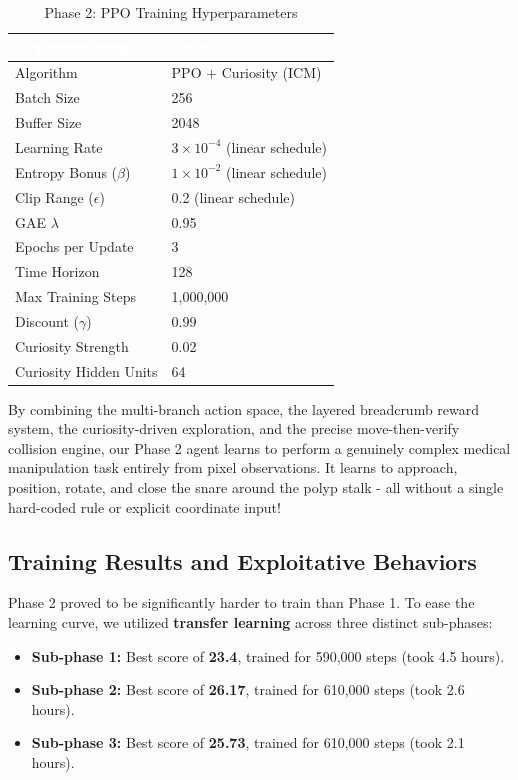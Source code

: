 \begin{table}[H]
\centering
\caption{Phase 2: PPO Training Hyperparameters}
\label{tab:p2_hyperparameters}
\begin{tabular}{|l|l|}
\rowcolor{primary}
\textcolor{white}{\textbf{Hyperparameter}} & \textcolor{white}{\textbf{Value}} \\
\hline
Algorithm & PPO + Curiosity (ICM) \\
\hline
Batch Size & 256 \\
\hline
Buffer Size & 2048 \\
\hline
Learning Rate & $3 \times 10^{-4}$ (linear schedule) \\
\hline
Entropy Bonus ($\beta$) & $1 \times 10^{-2}$ (linear schedule) \\
\hline
Clip Range ($\epsilon$) & 0.2 (linear schedule) \\
\hline
GAE $\lambda$ & 0.95 \\
\hline
Epochs per Update & 3 \\
\hline
Time Horizon & 128 \\
\hline
Max Training Steps & 1,000,000 \\
\hline
Discount ($\gamma$) & 0.99 \\
\hline
Curiosity Strength & 0.02 \\
\hline
Curiosity Hidden Units & 64 \\
\hline
\end{tabular}
\end{table}

By combining the multi-branch action space, the layered breadcrumb reward system, the curiosity-driven exploration, and the precise move-then-verify collision engine, our Phase 2 agent learns to perform a genuinely complex medical manipulation task entirely from pixel observations. It learns to approach, position, rotate, and close the snare around the polyp stalk - all without a single hard-coded rule or explicit coordinate input!

\clearpage
\subsection{Training Results and Exploitative Behaviors}
Phase 2 proved to be significantly harder to train than Phase 1. To ease the learning curve, we utilized \textbf{transfer learning} across three distinct sub-phases:
\begin{itemize}
\item \textbf{Sub-phase 1:} Best score of \textbf{23.4}, trained for 590,000 steps (took 4.5 hours).
\item \textbf{Sub-phase 2:} Best score of \textbf{26.17}, trained for 610,000 steps (took 2.6 hours).
\item \textbf{Sub-phase 3:} Best score of \textbf{25.73}, trained for 610,000 steps (took 2.1 hours).
\end{itemize}

